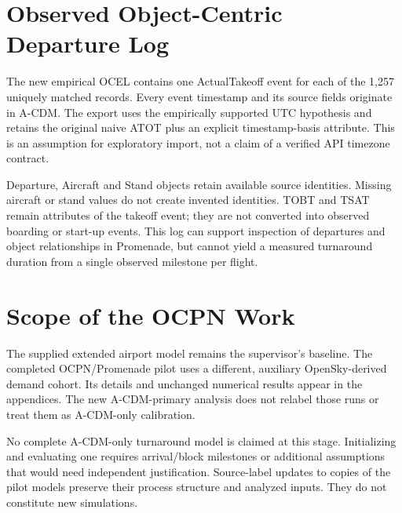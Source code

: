 \section{Observed Object-Centric Departure Log}
The new empirical OCEL contains one ActualTakeoff event for each of the 1,257 uniquely matched records. Every event timestamp and its source fields originate in A-CDM. The export uses the empirically supported UTC hypothesis and retains the original naive ATOT plus an explicit timestamp-basis attribute. This is an assumption for exploratory import, not a claim of a verified API timezone contract.

Departure, Aircraft and Stand objects retain available source identities. Missing aircraft or stand values do not create invented identities. TOBT and TSAT remain attributes of the takeoff event; they are not converted into observed boarding or start-up events. This log can support inspection of departures and object relationships in Promenade, but cannot yield a measured turnaround duration from a single observed milestone per flight.

\section{Scope of the OCPN Work}
The supplied extended airport model remains the supervisor's baseline. The completed OCPN/Promenade pilot uses a different, auxiliary OpenSky-derived demand cohort. Its details and unchanged numerical results appear in the appendices. The new A-CDM-primary analysis does not relabel those runs or treat them as A-CDM-only calibration.

No complete A-CDM-only turnaround model is claimed at this stage. Initializing and evaluating one requires arrival/block milestones or additional assumptions that would need independent justification. Source-label updates to copies of the pilot models preserve their process structure and analyzed inputs. They do not constitute new simulations.
